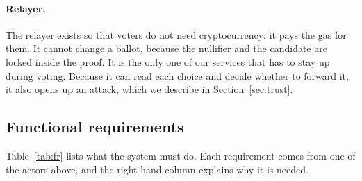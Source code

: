 \paragraph{Relayer.}
The relayer exists so that voters do not need cryptocurrency: it pays the gas
for them. It cannot change a ballot, because the nullifier and the candidate
are locked inside the proof. It is the only one of our services that has to
stay up during voting. Because it can read each choice and decide whether to
forward it, it also opens up an attack, which we describe in
Section~\ref{sec:trust}.

\subsection{Functional requirements}

Table~\ref{tab:fr} lists what the system must do. Each requirement comes from
one of the actors above, and the right-hand column explains why it is needed.

